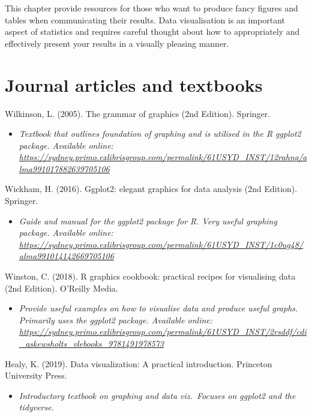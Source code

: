 \documentclass[
]{book}
\providecommand{\tightlist}{%
  \setlength{\itemsep}{0pt}\setlength{\parskip}{0pt}}
\begin{document}
This chapter provide resources for those who want to produce fancy figures and tables when communicating their results. Data visualisation is an important aspect of statistics and requires careful thought about how to appropriately and effectively present your results in a visually pleasing manner.

\section{Journal articles and textbooks}\label{journal-articles-and-textbooks-1}

Wilkinson, L. (2005). The grammar of graphics (2nd Edition). Springer.

\begin{itemize}
\tightlist
\item
  \emph{Textbook that outlines foundation of graphing and is utilised in the R ggplot2 package. Available online: \url{https://sydney.primo.exlibrisgroup.com/permalink/61USYD_INST/12rahnq/alma991017882639705106} }
\end{itemize}

Wickham, H. (2016). Ggplot2: elegant graphics for data analysis (2nd Edition). Springer.

\begin{itemize}
\tightlist
\item
  \emph{Guide and manual for the ggplot2 package for R. Very useful graphing package. Available online: \url{https://sydney.primo.exlibrisgroup.com/permalink/61USYD_INST/1c0ug48/alma991014142669705106}}
\end{itemize}

Winston, C. (2018). R graphics cookbook: practical recipes for visualising data (2nd Edition). O'Reilly Media.

\begin{itemize}
\tightlist
\item
  \emph{Provide useful examples on how to visualise data and produce useful graphs. Primarily uses the ggplot2 package. Available online: \url{https://sydney.primo.exlibrisgroup.com/permalink/61USYD_INST/2rsddf/cdi_askewsholts_vlebooks_9781491978573}}
\end{itemize}

Healy, K. (2019). Data visualization: A practical introduction. Princeton University Press.

\begin{itemize}
\tightlist
\item
  \emph{Introductory textbook on graphing and data viz.~Focuses on ggplot2 and the tidyverse.}
\end{itemize}
\end{document}
